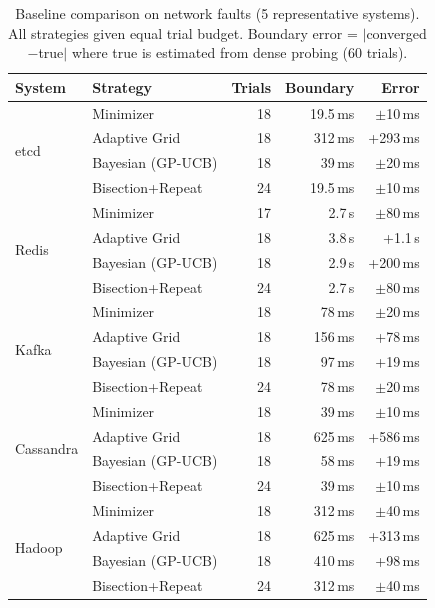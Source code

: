 \begin{table}[t]
\centering
\caption{Baseline comparison on network faults (5 representative systems).
All strategies given equal trial budget. Boundary error = $|$converged$-$true$|$
where true is estimated from dense probing (60 trials).}
\label{tab:baselines}
\small
\begin{tabular}{@{}llrrr@{}}
\toprule
\textbf{System} & \textbf{Strategy} & \textbf{Trials} & \textbf{Boundary} & \textbf{Error} \\
\midrule
\multirow{4}{*}{etcd}
  & \system{} Minimizer      & 18 & 19.5\,ms  & $\pm$10\,ms \\
  & Adaptive Grid            & 18 & 312\,ms   & +293\,ms \\
  & Bayesian (GP-UCB)        & 18 & 39\,ms    & $\pm$20\,ms \\
  & Bisection+Repeat         & 24 & 19.5\,ms  & $\pm$10\,ms \\
\midrule
\multirow{4}{*}{Redis}
  & \system{} Minimizer      & 17 & 2.7\,s    & $\pm$80\,ms \\
  & Adaptive Grid            & 18 & 3.8\,s    & +1.1\,s \\
  & Bayesian (GP-UCB)        & 18 & 2.9\,s    & +200\,ms \\
  & Bisection+Repeat         & 24 & 2.7\,s    & $\pm$80\,ms \\
\midrule
\multirow{4}{*}{Kafka}
  & \system{} Minimizer      & 18 & 78\,ms    & $\pm$20\,ms \\
  & Adaptive Grid            & 18 & 156\,ms   & +78\,ms \\
  & Bayesian (GP-UCB)        & 18 & 97\,ms    & +19\,ms \\
  & Bisection+Repeat         & 24 & 78\,ms    & $\pm$20\,ms \\
\midrule
\multirow{4}{*}{Cassandra}
  & \system{} Minimizer      & 18 & 39\,ms    & $\pm$10\,ms \\
  & Adaptive Grid            & 18 & 625\,ms   & +586\,ms \\
  & Bayesian (GP-UCB)        & 18 & 58\,ms    & +19\,ms \\
  & Bisection+Repeat         & 24 & 39\,ms    & $\pm$10\,ms \\
\midrule
\multirow{4}{*}{Hadoop}
  & \system{} Minimizer      & 18 & 312\,ms   & $\pm$40\,ms \\
  & Adaptive Grid            & 18 & 625\,ms   & +313\,ms \\
  & Bayesian (GP-UCB)        & 18 & 410\,ms   & +98\,ms \\
  & Bisection+Repeat         & 24 & 312\,ms   & $\pm$40\,ms \\
\bottomrule
\end{tabular}
\end{table}

